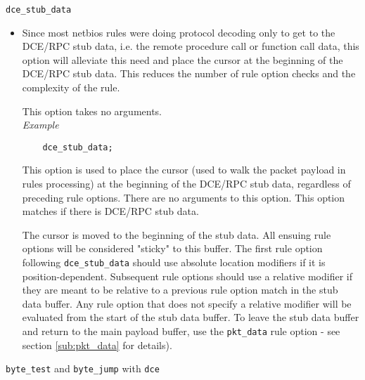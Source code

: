 \documentclass[english]{report}
\begin{document}
\texttt{dce\_stub\_data}
\label{dcerpc2:dce_stub_data}
\begin{itemize}

\item[] Since most netbios rules were doing protocol decoding only to get to
the DCE/RPC stub data, i.e. the remote procedure call or function call data,
this option will alleviate this need and place the cursor at the beginning of
the DCE/RPC stub data. This reduces the number of rule option checks and the
complexity of the rule.

This option takes no arguments.\\

\textit{Example}
\footnotesize
\begin{verbatim}
    dce_stub_data;
\end{verbatim}
\normalsize

This option is used to place the cursor (used to walk the packet payload in
rules processing) at the beginning of the DCE/RPC stub data, regardless of
preceding rule options. There are no arguments to this option.  This option
matches if there is DCE/RPC stub data.

The cursor is moved to the beginning of the stub data.  All ensuing rule
options will be considered "sticky" to this buffer.  The first rule option
following \texttt{dce\_stub\_data} should use absolute location modifiers if it is
position-dependent.  Subsequent rule options should use a relative modifier if
they are meant to be relative to a previous rule option match in the stub data
buffer.  Any rule option that does not specify a relative modifier will be
evaluated from the start of the stub data buffer.  To leave the stub data buffer
and return to the main payload buffer, use the \texttt{pkt\_data} rule option -
see section \ref{sub:pkt_data} for details).

\end{itemize}
\texttt{byte\_test} and \texttt{byte\_jump} with \texttt{dce}\label{dcerpc2:byte_test_jump}
\end{document}
